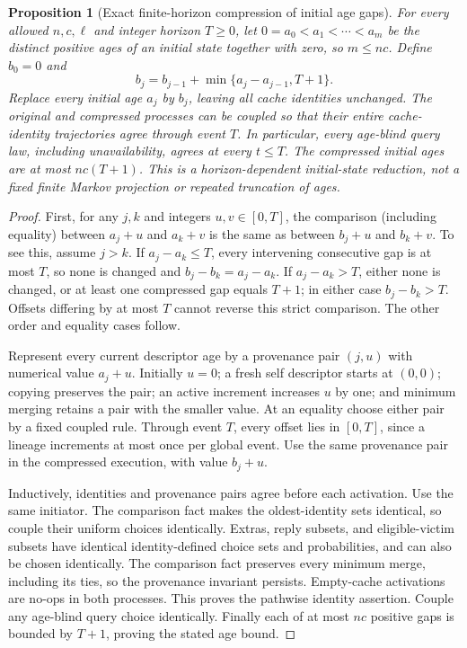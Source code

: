 \documentclass[11pt]{article}
\newtheorem{proposition}[theorem]{Proposition}
\begin{document}
\begin{proposition}[Exact finite-horizon compression of initial age gaps]
\label{prop:finitehorizonagecompression}
For every allowed $n,c,\ell$ and integer horizon $T\ge0$,
let $0=a_0<a_1<\cdots<a_m$ be the distinct positive ages
of an initial state together with zero, so $m\le nc$.
Define $b_0=0$ and
\[
 b_j=b_{j-1}+\min\{a_j-a_{j-1},T+1\}.
\]
Replace every initial age $a_j$ by $b_j$, leaving all cache
identities unchanged. The original and compressed processes
can be coupled so that their entire cache-identity trajectories
agree through event $T$. In particular, every age-blind query
law, including unavailability, agrees at every $t\le T$.
The compressed initial ages are at most $nc(T+1)$.
This is a horizon-dependent initial-state reduction, not a
fixed finite Markov projection or repeated truncation of ages.
\end{proposition}
\begin{proof}
First, for any $j,k$ and integers $u,v\in[0,T]$, the comparison
(including equality) between $a_j+u$ and $a_k+v$ is the same
as between $b_j+u$ and $b_k+v$. To see this, assume $j>k$.
If $a_j-a_k\le T$, every intervening consecutive gap is
at most $T$, so none is changed and $b_j-b_k=a_j-a_k$.
If $a_j-a_k>T$, either none is changed, or at least one
compressed gap equals $T+1$; in either case $b_j-b_k>T$.
Offsets differing by at most $T$ cannot reverse this strict
comparison. The other order and equality cases follow.

Represent every current descriptor age by a provenance pair
$(j,u)$ with numerical value $a_j+u$. Initially $u=0$;
a fresh self descriptor starts at $(0,0)$; copying preserves
the pair; an active increment increases $u$ by one; and
minimum merging retains a pair with the smaller value.
At an equality choose either pair by a fixed coupled rule.
Through event $T$, every offset lies in $[0,T]$, since a
lineage increments at most once per global event.
Use the same provenance pair in the compressed execution,
with value $b_j+u$.

Inductively, identities and provenance pairs agree before
each activation. Use the same initiator. The comparison fact
makes the oldest-identity sets identical, so couple their
uniform choices identically. Extras, reply subsets, and
eligible-victim subsets have identical identity-defined choice
sets and probabilities, and can also be chosen identically.
The comparison fact preserves every minimum merge, including
its ties, so the provenance invariant persists. Empty-cache
activations are no-ops in both processes. This proves the
pathwise identity assertion. Couple any age-blind query choice
identically. Finally each of at most $nc$ positive gaps is
bounded by $T+1$, proving the stated age bound.
\end{proof}
\end{document}
